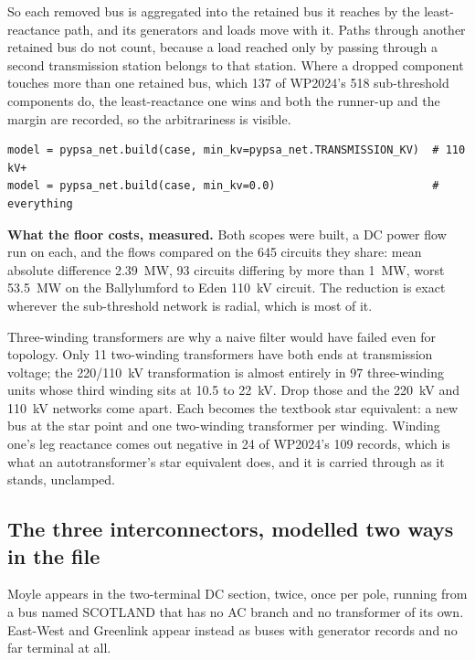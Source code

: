 \documentclass[11pt,a4paper]{article}
\begin{document}
So each removed bus is aggregated into the retained bus it reaches by the
least-reactance path, and its generators and loads move with it. Paths through
another retained bus do not count, because a load reached only by passing
through a second transmission station belongs to that station. Where a dropped
component touches more than one retained bus, which 137 of WP2024's 518
sub-threshold components do, the least-reactance one wins and both the
runner-up and the margin are recorded, so the arbitrariness is visible.

\begin{lstlisting}
model = pypsa_net.build(case, min_kv=pypsa_net.TRANSMISSION_KV)  # 110 kV+
model = pypsa_net.build(case, min_kv=0.0)                        # everything
\end{lstlisting}

\textbf{What the floor costs, measured.} Both scopes were built, a DC power
flow run on each, and the flows compared on the 645 circuits they share: mean
absolute difference 2.39~MW, 93 circuits differing by more than 1~MW, worst
53.5~MW on the Ballylumford to Eden 110~kV circuit. The reduction is exact
wherever the sub-threshold network is radial, which is most of it.

Three-winding transformers are why a naive filter would have failed even for
topology. Only 11 two-winding transformers have both ends at transmission
voltage; the 220/110~kV transformation is almost entirely in 97 three-winding
units whose third winding sits at 10.5 to 22~kV. Drop those and the 220~kV and
110~kV networks come apart. Each becomes the textbook star equivalent: a new
bus at the star point and one two-winding transformer per winding. Winding one's
leg reactance comes out negative in 24 of WP2024's 109 records, which is what
an autotransformer's star equivalent does, and it is carried through as it
stands, unclamped.


\subsection{The three interconnectors, modelled two ways in the file}

Moyle appears in the two-terminal DC section, twice, once per pole, running
from a bus named SCOTLAND that has no AC branch and no transformer of its own.
East-West and Greenlink appear instead as buses with generator records and no
far terminal at all.
\end{document}
